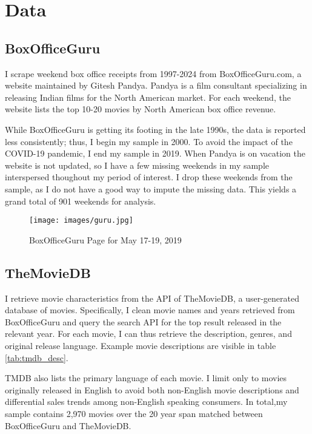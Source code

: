 \documentclass{article}
\begin{document}
\section{Data}

\subsection{BoxOfficeGuru}

I scrape weekend box office receipts from 1997-2024 from BoxOfficeGuru.com, a website maintained by Gitesh Pandya. Pandya is a film consultant specializing in releasing Indian films for the North American market. For each weekend, the website lists the top 10-20 movies by North American box office revenue. 

While BoxOfficeGuru is getting its footing in the late 1990s, the data is reported less consistently; thus, I begin my sample in 2000. To avoid the impact of the COVID-19 pandemic, I end my sample in 2019. When Pandya is on vacation the website is not updated, so I have a few missing weekends in my sample interspersed thoughout my period of interest. I drop these weekends from the sample, as I do not have a good way to impute the missing data. This yields a grand total of 901 weekends for analysis.

\begin{figure}
    \texttt{[image: images/guru.jpg]}
    \caption{BoxOfficeGuru Page for May 17-19, 2019}
    \label{fig:guru}
\end{figure}


\subsection{TheMovieDB}

I retrieve movie characteristics from the API of TheMovieDB, a user-generated database of movies. Specifically, I clean movie names and years retrieved from BoxOfficeGuru and query the search API for the top result released in the relevant year. For each movie, I can thus retrieve the description, genres, and original release language. Example movie descriptions are visible in table \ref{tab:tmdb_desc}.

TMDB also lists the primary language of each movie. I limit only to movies originally released in English to avoid both non-English movie descriptions and differential sales trends among non-English speaking consumers. In total,my sample contains 2,970 movies over the 20 year span matched between BoxOfficeGuru and TheMovieDB.
\end{document}
